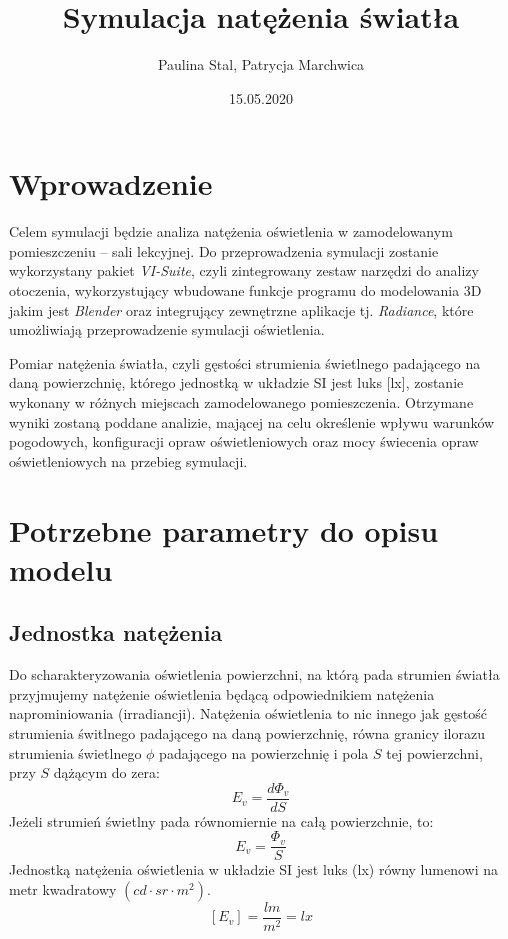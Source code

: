 \documentclass[a4paper,12pt]{article}
\title{Symulacja natężenia światła}
\author{Paulina Stal, Patrycja Marchwica}
\date{15.05.2020}
\begin{document}
	\maketitle
	
	\section{Wprowadzenie}
	\label{sec:wprowadzenie}
	
	Celem symulacji będzie analiza natężenia oświetlenia w zamodelowanym pomieszczeniu -- sali lekcyjnej. Do przeprowadzenia symulacji zostanie wykorzystany pakiet \emph{VI-Suite}, czyli zintegrowany zestaw narzędzi do analizy otoczenia, wykorzystujący wbudowane funkcje programu do modelowania 3D jakim jest \emph{Blender} oraz integrujący zewnętrzne aplikacje tj. \emph{Radiance}, które umożliwiają przeprowadzenie symulacji oświetlenia.
	
	Pomiar natężenia światła, czyli gęstości strumienia świetlnego padającego na daną powierzchnię, którego jednostką w układzie SI jest luks [lx], zostanie wykonany w różnych miejscach zamodelowanego pomieszczenia. Otrzymane wyniki zostaną poddane analizie, mającej na celu określenie wpływu warunków pogodowych, konfiguracji opraw oświetleniowych oraz mocy świecenia opraw oświetleniowych na przebieg symulacji.  
	

	\section{Potrzebne parametry do opisu modelu}
	 \label{sec:opis_modelu}

	\subsection{Jednostka natężenia}
	\label{sec:jednostka_natezenia}

	Do scharakteryzowania oświetlenia powierzchni, na którą pada strumien światła przyjmujemy natężenie oświetlenia będącą odpowiednikiem natężenia naprominiowania (irradiancji). Natężenia oświetlenia to nic innego jak gęstość strumienia świtlnego padającego na daną powierzchnię, równa granicy ilorazu strumienia świetlnego $\phi$ padającego na powierzchnię i pola $S$ tej powierzchni, przy $S$ dążącym do zera:
	$$E_{v}=\frac{d \Phi_{v}}{d S}$$
	Jeżeli strumień świetlny pada równomiernie na całą powierzchnie, to:
	$$E_{v}=\frac{\Phi_{v}}{S}$$
Jednostką natężenia oświetlenia w układzie SI jest luks (lx) równy lumenowi na metr kwadratowy $(cd \cdot sr \cdot m^{2})$.
	$$\left[E_{v}\right]=\frac{l m}{m^{2}}=l x$$
	\newpage
\end{document}
